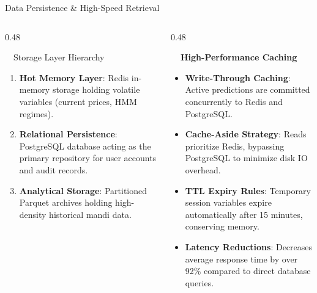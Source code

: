 \documentclass{beamer}
\begin{document}
\begin{frame}{Data Persistence \& High-Speed Retrieval}
\vspace{-0.2cm}

\begin{columns}[T]
    \begin{column}{0.48\textwidth}
        \begin{infocard}{~~Storage Layer Hierarchy}
            \fontsize{6.8pt}{8.5pt}\selectfont
            \begin{enumerate}\setlength\itemsep{3.5pt}\setlength\parskip{0pt}
                \item[\textbf{1.}] \textbf{Hot Memory Layer}: Redis in-memory storage holding volatile variables (current prices, HMM regimes).
                \item[\textbf{2.}] \textbf{Relational Persistence}: PostgreSQL database acting as the primary repository for user accounts and audit records.
                \item[\textbf{3.}] \textbf{Analytical Storage}: Partitioned Parquet archives holding high-density historical mandi data.
            \end{enumerate}
        \end{infocard}
    \end{column}
    
    \begin{column}{0.48\textwidth}
        \begin{smallcard}[0.98\textwidth, top=3pt, bottom=3pt, left=4pt, right=4pt, boxsep=0.5pt]
            \centering \textbf{\textcolor{primaryDark}{\small {}~~High-Performance Caching}}
            \vspace{0.08cm}
            \fontsize{6.8pt}{8.2pt}\selectfont
            \begin{itemize}\setlength\itemsep{4.5pt}\setlength\parskip{0pt}
                \item \textbf{Write-Through Caching}: Active predictions are committed concurrently to Redis and PostgreSQL.
                \item \textbf{Cache-Aside Strategy}: Reads prioritize Redis, bypassing PostgreSQL to minimize disk IO overhead.
                \item \textbf{TTL Expiry Rules}: Temporary session variables expire automatically after 15 minutes, conserving memory.
                \item \textbf{Latency Reductions}: Decreases average response time by over 92\% compared to direct database queries.
            \end{itemize}
        \end{smallcard}
    \end{column}
\end{columns}


\end{frame}
\end{document}
